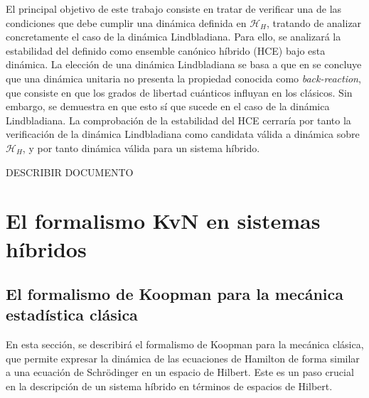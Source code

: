 \documentclass[openany, 11pt]{book}
\numberwithin{equation}{chapter}
\newcommand{\Hh}{\mathcal H_H}
\begin{document}
El principal objetivo de este trabajo consiste en tratar de verificar una de las condiciones que debe cumplir una dinámica definida en $\Hh$, tratando de analizar concretamente el caso de la dinámica Lindbladiana. 
Para ello, se analizará la estabilidad del definido como ensemble canónico híbrido (HCE) bajo esta dinámica. La elección de una dinámica Lindbladiana se basa a que en \cite{JPA} se concluye que una dinámica unitaria 
no presenta la propiedad conocida como \textit{back-reaction}, que consiste en que los grados de libertad cuánticos influyan en los clásicos. Sin embargo, se demuestra en \cite{Carmen} que esto sí que sucede en el caso de 
la dinámica Lindbladiana. La comprobación de la estabilidad del HCE cerraría por tanto la verificación de la dinámica Lindbladiana como candidata válida a dinámica sobre $\Hh$, y por tanto dinámica válida para un sistema híbrido.

DESCRIBIR DOCUMENTO

\chapter{El formalismo KvN en sistemas híbridos}

\section{El formalismo de Koopman para la mecánica estadística clásica}

En esta sección, se describirá el formalismo de Koopman para la mecánica clásica, que permite expresar la dinámica de 
las ecuaciones de Hamilton de forma similar a una ecuación de Schrödinger en un espacio de Hilbert. Este es un paso crucial en la descripción 
de un sistema híbrido en términos de espacios de Hilbert. 
\end{document}
